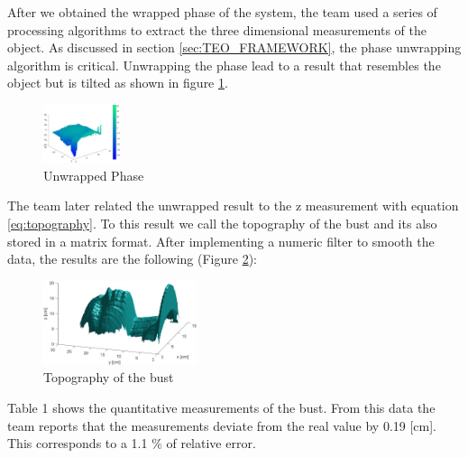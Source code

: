 After we obtained the wrapped phase of the system, the team used a series of processing algorithms to extract the three dimensional measurements of the object. As discussed in section \ref{sec:TEO_FRAMEWORK}, the phase unwrapping algorithm is critical. %
Unwrapping the phase lead to a result that resembles the object but is tilted as shown in figure \ref{fig:Unwrap_Phase}.

\begin{figure}[H]
    \centering
    \includegraphics[width=0.2\textwidth]{Figures/Unwrap_Phase.jpg}
    \caption{Unwrapped Phase}
    \label{fig:Unwrap_Phase}
\end{figure}

 The team later related the unwrapped result to the z measurement with equation \ref{eq:topography}. To this result we call the topography of the bust and its also stored in a matrix format. After implementing a numeric filter to smooth the data, the results are the following (Figure \ref{fig:TopBust}):

\begin{figure}[H]
    \centering
    \includegraphics[width=0.4\textwidth]{Figures/Bust_Face.jpg}
    \caption{Topography of the bust}
    \label{fig:TopBust}
\end{figure}

Table 1 shows the quantitative measurements of the bust. From this data the team reports that the measurements deviate from the real value by 0.19 [cm]. This corresponds to a 1.1 $\%$ of relative error. 

\begin{table}[H]
\label{tab:Measure}
\caption{Measurements of the Bust}
\end{table}

